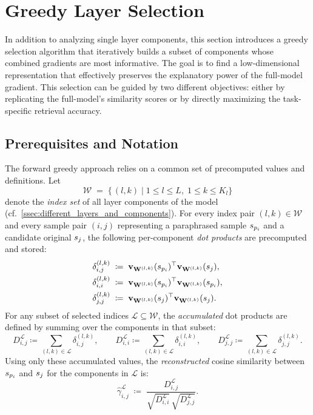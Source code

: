 \section{Greedy Layer Selection}\label{sec:greedy_layer_selection}
In addition to analyzing single layer components, this section introduces a greedy selection algorithm that iteratively builds a subset of components whose combined gradients are most informative. The goal is to find a low-dimensional representation that effectively preserves the explanatory power of the full-model gradient. This selection can be guided by two different objectives: either by replicating the full-model's similarity scores or by directly maximizing the task-specific retrieval accuracy.

\subsection{Prerequisites and Notation}
The forward greedy approach relies on a common set of precomputed values and definitions. Let
\[
\mathcal{W} \;=\; \bigl\{\, (l,k) \;\big|\; 1 \le l \le L,\; 1 \le k \le K_l \bigr\}
\]
denote the \emph{index set} of all layer components of the model (cf.\ \autoref{ssec:different_layers_and_components}). For every index pair $(l,k) \in \mathcal{W}$ and every sample pair $(i,j)$ representing a paraphrased sample $\spi$ and a candidate original $\sj$, the following per-component \emph{dot products} are precomputed and stored:
\begin{equation}
\begin{split}
\delta^{(l,k)}_{i,j} \;&\coloneqq\; \vXspi[\Wlk]^{\top}\vXsj[\Wlk],\\
\delta^{(l,k)}_{i,i} \;&\coloneqq\; \vXspi[\Wlk]^{\top}\vXspi[\Wlk],\\
\delta^{(l,k)}_{j,j} \;&\coloneqq\; \vXsj[\Wlk]^{\top}\vXsj[\Wlk].
\end{split}
\label{eq:layer_dot_products}
\end{equation}
For any subset of selected indices $\mathcal{L}\subseteq\mathcal{W}$, the \emph{accumulated} dot products are defined by summing over the components in that subset:
\[
D^{\mathcal{L}}_{i,j} \coloneqq \sum_{(l,k)\in\mathcal{L}}\delta^{(l,k)}_{i,j}, \qquad
D^{\mathcal{L}}_{i,i} \coloneqq \sum_{(l,k)\in\mathcal{L}}\delta^{(l,k)}_{i,i}, \qquad
D^{\mathcal{L}}_{j,j} \coloneqq \sum_{(l,k)\in\mathcal{L}}\delta^{(l,k)}_{j,j}.
\]
Using only these accumulated values, the \emph{reconstructed} cosine similarity between $\spi$ and $\sj$ for the components in $\mathcal{L}$ is:
\begin{equation}
\hat{\gamma}^{\mathcal{L}}_{i,j}
\;\coloneqq\;
\frac{D^{\mathcal{L}}_{i,j}}
     {\sqrt{D^{\mathcal{L}}_{i,i}}\,
      \sqrt{D^{\mathcal{L}}_{j,j}}}.
\label{eq:reconstructed_cosine}
\end{equation}

